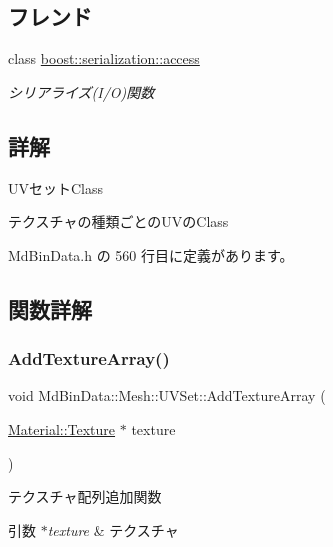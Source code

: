 \subsection*{フレンド}
\begin{DoxyCompactItemize}
\item 
class \mbox{\hyperlink{class_md_bin_data_1_1_mesh_1_1_u_v_set_ac98d07dd8f7b70e16ccb9a01abf56b9c}{boost\+::serialization\+::access}}
\begin{DoxyCompactList}\small\item\em シリアライズ(I/O)関数 \end{DoxyCompactList}\end{DoxyCompactItemize}


\subsection{詳解}
U\+Vセット\+Class 

テクスチャの種類ごとの\+U\+Vの\+Class 

 Md\+Bin\+Data.\+h の 560 行目に定義があります。



\subsection{関数詳解}
\mbox{\label{class_md_bin_data_1_1_mesh_1_1_u_v_set_a6b9333784f0a6b52dafebadd610da2cf}} 
\subsubsection{\texorpdfstring{Add\+Texture\+Array()}{AddTextureArray()}}
{\footnotesize\ttfamily void Md\+Bin\+Data\+::\+Mesh\+::\+U\+V\+Set\+::\+Add\+Texture\+Array (\begin{DoxyParamCaption}\item[{\mbox{\hyperlink{class_md_bin_data_1_1_material_1_1_texture}{Material\+::\+Texture}} $\ast$}]{texture }\end{DoxyParamCaption})}



テクスチャ配列追加関数 


\begin{DoxyParams}{引数}
{\em $\ast$texture} & テクスチャ \\
\hline
\end{DoxyParams}

